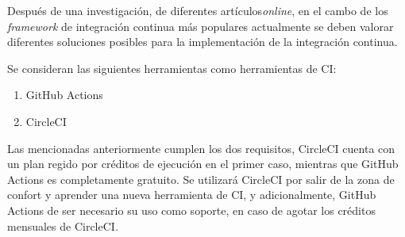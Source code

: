 Después de una investigación, de diferentes artículos\emph{online}, en el cambo de los \emph{framework} de integración continua más populares actualmente se deben valorar diferentes soluciones posibles para la implementación de la integración continua. \cite{CIKumar2023}\cite{CITaylor2023}\cite{CIRoddewig2023}

Se consideran las siguientes herramientas como herramientas de CI:
\begin{enumerate}
    \item GitHub Actions
    \item CircleCI
\end{enumerate}

Las mencionadas anteriormente cumplen los dos requisitos, CircleCI cuenta con un plan regido por créditos de ejecución en el primer caso, mientras que GitHub Actions es completamente gratuito. Se utilizará CircleCI por salir de la zona de confort y aprender una nueva herramienta de CI, y adicionalmente, GitHub Actions de ser necesario su uso como soporte, en caso de agotar los créditos mensuales de CircleCI. 

